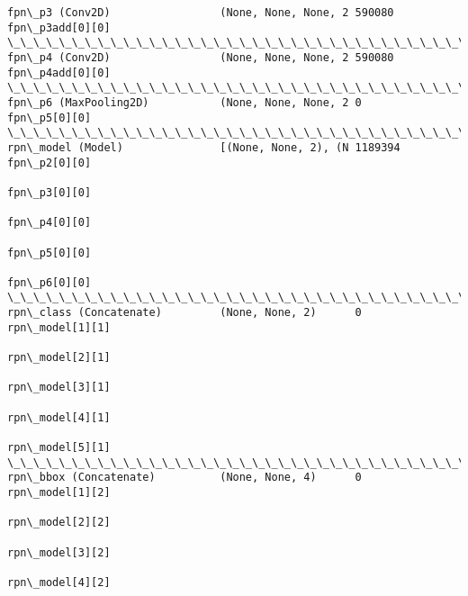 \documentclass[11pt]{article}
\begin{document}
\begin{Verbatim}[commandchars=\\\{\}]
fpn\_p3 (Conv2D)                 (None, None, None, 2 590080      fpn\_p3add[0][0]                  
\_\_\_\_\_\_\_\_\_\_\_\_\_\_\_\_\_\_\_\_\_\_\_\_\_\_\_\_\_\_\_\_\_\_\_\_\_\_\_\_\_\_\_\_\_\_\_\_\_\_\_\_\_\_\_\_\_\_\_\_\_\_\_\_\_\_\_\_\_\_\_\_\_\_\_\_\_\_\_\_\_\_\_\_\_\_\_\_\_\_\_\_\_\_\_\_\_\_
fpn\_p4 (Conv2D)                 (None, None, None, 2 590080      fpn\_p4add[0][0]                  
\_\_\_\_\_\_\_\_\_\_\_\_\_\_\_\_\_\_\_\_\_\_\_\_\_\_\_\_\_\_\_\_\_\_\_\_\_\_\_\_\_\_\_\_\_\_\_\_\_\_\_\_\_\_\_\_\_\_\_\_\_\_\_\_\_\_\_\_\_\_\_\_\_\_\_\_\_\_\_\_\_\_\_\_\_\_\_\_\_\_\_\_\_\_\_\_\_\_
fpn\_p6 (MaxPooling2D)           (None, None, None, 2 0           fpn\_p5[0][0]                     
\_\_\_\_\_\_\_\_\_\_\_\_\_\_\_\_\_\_\_\_\_\_\_\_\_\_\_\_\_\_\_\_\_\_\_\_\_\_\_\_\_\_\_\_\_\_\_\_\_\_\_\_\_\_\_\_\_\_\_\_\_\_\_\_\_\_\_\_\_\_\_\_\_\_\_\_\_\_\_\_\_\_\_\_\_\_\_\_\_\_\_\_\_\_\_\_\_\_
rpn\_model (Model)               [(None, None, 2), (N 1189394     fpn\_p2[0][0]                     
                                                                 fpn\_p3[0][0]                     
                                                                 fpn\_p4[0][0]                     
                                                                 fpn\_p5[0][0]                     
                                                                 fpn\_p6[0][0]                     
\_\_\_\_\_\_\_\_\_\_\_\_\_\_\_\_\_\_\_\_\_\_\_\_\_\_\_\_\_\_\_\_\_\_\_\_\_\_\_\_\_\_\_\_\_\_\_\_\_\_\_\_\_\_\_\_\_\_\_\_\_\_\_\_\_\_\_\_\_\_\_\_\_\_\_\_\_\_\_\_\_\_\_\_\_\_\_\_\_\_\_\_\_\_\_\_\_\_
rpn\_class (Concatenate)         (None, None, 2)      0           rpn\_model[1][1]                  
                                                                 rpn\_model[2][1]                  
                                                                 rpn\_model[3][1]                  
                                                                 rpn\_model[4][1]                  
                                                                 rpn\_model[5][1]                  
\_\_\_\_\_\_\_\_\_\_\_\_\_\_\_\_\_\_\_\_\_\_\_\_\_\_\_\_\_\_\_\_\_\_\_\_\_\_\_\_\_\_\_\_\_\_\_\_\_\_\_\_\_\_\_\_\_\_\_\_\_\_\_\_\_\_\_\_\_\_\_\_\_\_\_\_\_\_\_\_\_\_\_\_\_\_\_\_\_\_\_\_\_\_\_\_\_\_
rpn\_bbox (Concatenate)          (None, None, 4)      0           rpn\_model[1][2]                  
                                                                 rpn\_model[2][2]                  
                                                                 rpn\_model[3][2]                  
                                                                 rpn\_model[4][2]                  

\end{Verbatim}
\end{document}
